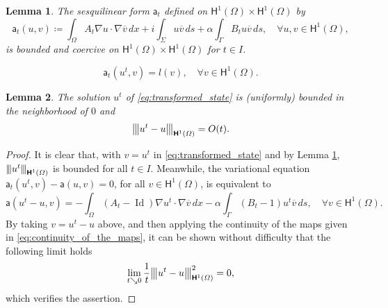 \documentclass[10pt,a4paper]{amsart}
\newtheorem{lemma}{Lemma}
\newcommand{\HH}{\vect{\mathsf{H}}}
\newcommand{\Id}{\operatorname{Id}}
\newcommand{\aaa}{{\mathsf{a}}}
\newcommand{\aat}{{\mathsf{a}}_t}
\newcommand{\cv}{\overline{v}}
\newcommand{\intG}[1]{\int_{\varGamma}{#1}{\, {d}{s}}}
\newcommand{\intO}[1]{\int_{\varOmega}{#1}{\, {d}{x}}}
\newcommand{\intS}[1]{\int_{\varSigma}{#1}{\, {d}{s}}}
\newcommand{\intervalI}{I}
\newcommand{\vect}[1]{\boldsymbol{\mathbf{#1}}}
\newcommand{\vertiii}[1]{{\left\vert\kern-0.25ex\left\vert\kern-0.25ex\left\vert #1 
    \right\vert\kern-0.25ex\right\vert\kern-0.25ex\right\vert}}
\begin{document}
\begin{lemma}\label{lem:sesquiliner_form}
	The sesquilinear form $\aat$ defined on $\HH^{1}(\varOmega) \times \HH^{1}(\varOmega)$ by
	\[
		\aat({u},{v}) \coloneqq \intO{A_t \nabla {u} \cdot \nabla {\cv}} + i \intS{{u} {\cv}} + \alpha \intG{B_t {u} {\cv}}, \quad \forall {u}, {v} \in \HH^{1}(\varOmega),
	\]
	is bounded and coercive on $\HH^{1}(\varOmega) \times \HH^{1}(\varOmega)$ for $t \in \intervalI$.
\end{lemma} 

	\begin{equation}\label{eq:transformed_state}
		\aat({u^{t}},{v}) = l({v}), \quad \forall {v} \in \HH^{1}(\varOmega).	
	\end{equation}

\begin{lemma}\label{lem:holder_continuity}
	The solution ${u^{t}}$ of \eqref{eq:transformed_state} is (uniformly) bounded in the neighborhood of $0$ and 
	\[
		\vertiii{u^{t} - u}_{\HH^{1}(\varOmega)} = O(t).
	\] 
\end{lemma}

\begin{proof}
	It is clear that, with $v = u^{t}$ in \eqref{eq:transformed_state} and by Lemma \ref{lem:sesquiliner_form}, $\vertiii{u^{t}}_{\HH^{1}(\varOmega)}$ is bounded for all $t\in \intervalI$.
	Meanwhile, the variational equation $\aat(u^{t},v) - \aaa(u,v) = 0$, for all ${v} \in \HH^{1}(\varOmega)$, is equivalent to
	\begin{equation}\label{eq:difference_equation}
	\aaa(u^{t} - u, v) = - \intO{(A_{t} - \Id) \nabla {u^{t}} \cdot \nabla {\cv}} - \alpha \intG{ (B_{t} - 1) {u^{t}} {\cv}},\quad \forall {v} \in \HH^{1}(\varOmega).
	\end{equation}
	By taking $v = u^{t} - u$ above, and then applying the continuity of the maps given in \eqref{eq:continuity_of_the_maps}, it can be shown without difficulty that the following limit holds
	\[
		\lim_{t \searrow 0} \frac{1}{t} \vertiii{u^{t} - u}_{\HH^{1}(\varOmega)}^{2} = 0,	
	\]
	which verifies the assertion.
\end{proof}
\end{document}
